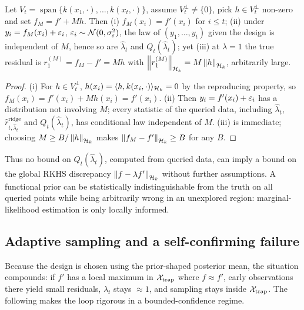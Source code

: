 \begin{proposition}
\label{app:prop-local}
Let $V_t=\operatorname{span}\{k(x_1,\cdot),\dots,k(x_t,\cdot)\}$, assume
$V_t^\perp\neq\{0\}$, pick $h\in V_t^\perp$ non-zero and set $f_M=f'+Mh$. Then
(i) $f_M(x_i)=f'(x_i)$ for $i\le t$; (ii) under $y_i=f_M(x_i)+\varepsilon_i$,
$\varepsilon_i\sim\mathcal N(0,\sigma_\varepsilon^2)$, the law of $(y_1,\dots,y_t)$ given the
design is independent of $M$, hence so are $\widehat\lambda_t$ and
$Q_t(\widehat\lambda_t)$; yet (iii) at $\lambda=1$ the true residual is
$r_1^{(M)}=f_M-f'=Mh$ with $\left\lVert r_1^{(M)}\right\rVert_{\mathcal{H}_k}=M\left\lVert h\right\rVert_{\mathcal{H}_k}$, arbitrarily
large.
\end{proposition}
\begin{proof}
(i) For $h\in V_t^\perp$, $h(x_i)=\langle h, k(x_i,\cdot)\rangle_{\mathcal{H}_k}=0$ by the
reproducing property, so $f_M(x_i)=f'(x_i)+Mh(x_i)=f'(x_i)$. (ii) Then
$y_i=f'(x_i)+\varepsilon_i$ has a distribution not involving $M$; every statistic of the
queried data, including $\widehat\lambda_t$, $\widehat r^{\mathrm{ridge}}_{t,\widehat\lambda_t}$
and $Q_t(\widehat\lambda_t)$, has conditional law independent of $M$. (iii) is
immediate; choosing $M\ge B/\left\lVert h\right\rVert_{\mathcal{H}_k}$ makes $\left\lVert f_M-f'\right\rVert_{\mathcal{H}_k}\ge B$ for
any $B$.
\end{proof}

\begin{remark}
Thus no bound on $Q_t(\widehat\lambda_t)$, computed from queried data, can imply a
bound on the global RKHS discrepancy $\left\lVert f-\lambda f'\right\rVert_{\mathcal{H}_k}$ without further
assumptions. A functional prior can be statistically indistinguishable from the
truth on all queried points while being arbitrarily wrong in an unexplored
region: marginal-likelihood estimation is only locally informed.
\end{remark}

\subsection{Adaptive sampling and a self-confirming failure}

Because the design is chosen using the prior-shaped posterior mean, the situation
compounds: if $f'$ has a local maximum in $\mathcal{X}_{\mathrm{trap}}$ where $f\approx f'$,
early observations there yield small residuals, $\widehat\lambda_t$ stays
$\approx1$, and sampling stays inside $\mathcal{X}_{\mathrm{trap}}$. The following makes the
loop rigorous in a bounded-confidence regime.


